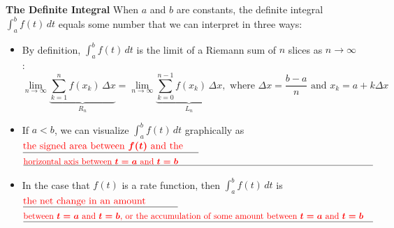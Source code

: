 \documentclass{article}
\begin{document}

\begin{framed}
\textbf{The Definite Integral} When $a$ and $b$ are constants, the definite integral $\displaystyle \int_a^b f(t)\,dt$ equals some number that we can interpret in three ways:
    \begin{itemize}
        \item By definition, $\displaystyle \int_a^b f(t)\,dt$ is the limit of a Riemann sum of $n$ slices as $n \to \infty$: 
        \[ \lim_{n \to \infty} \underbrace{\sum_{k=1}^n f(x_k)\, \Delta x}_{R_n}
    = \lim_{n \to \infty} \underbrace{\sum_{k=0}^{n-1} f(x_k)\, \Delta
      x}_{L_n}, \text{ where } \Delta x = \frac{b - a}{n} \text{ and } x_k
    = a + k \Delta x\]
    \vspace{-17pt}
        \item If $a<b$, we can visualize $\displaystyle \int_a^b f(t)\,dt$ graphically as $\fitb{2.5in}{\text{\textcolor{red}{the signed area between $f(t)$ and the}}}$
        \newline
        \newline
        $\fitb{5.6in}{\text{\textcolor{red}{horizontal axis between $t=a$ and $t=b$}}}$
        \newline
        \item In the case that $f(t)$ is a rate function, then $\displaystyle \int_a^b f(t)\,dt$ is $\fitb{2.2in}{\text{\textcolor{red}{the net change in an amount}}}$
        \newline
        \newline
        $\fitb{5.6in}{\text{\textcolor{red}{between $t=a$ and $t=b$, or the accumulation of some amount between $t=a$ and $t=b$}}}$
    \end{itemize}
    \end{framed}
\end{document}
